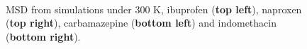 \begin{figure}[htb]
	\centering
	\\
	\caption{MSD from simulations under 300 K, ibuprofen (\textbf{top left}), naproxen (\textbf{top right}), carbamazepine (\textbf{bottom left}) and indomethacin (\textbf{bottom right}).}
	\label{fig:msd_r1}    
\end{figure}


